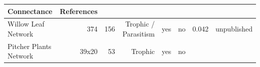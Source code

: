 \begin{longtable}[]{@{}lrrrrrrr@{}}
\begin{minipage}[b]{0.06\columnwidth}
Connectance\strut
\end{minipage} & \begin{minipage}[b]{0.22\columnwidth}\raggedleft\strut
References\strut
\end{minipage}\tabularnewline
\midrule
\endhead
\begin{minipage}[t]{0.15\columnwidth}\raggedright\strut
Willow Leaf Network\strut
\end{minipage} & \begin{minipage}[t]{0.07\columnwidth}\raggedleft\strut
374\strut
\end{minipage} & \begin{minipage}[t]{0.07\columnwidth}\raggedleft\strut
156\strut
\end{minipage} & \begin{minipage}[t]{0.11\columnwidth}\raggedleft\strut
Trophic / Parasitism\strut
\end{minipage} & \begin{minipage}[t]{0.05\columnwidth}\raggedleft\strut
yes\strut
\end{minipage} & \begin{minipage}[t]{0.04\columnwidth}\raggedleft\strut
no\strut
\end{minipage} & \begin{minipage}[t]{0.06\columnwidth}\raggedleft\strut
0.042\strut
\end{minipage} & \begin{minipage}[t]{0.22\columnwidth}\raggedleft\strut
unpublished\strut
\end{minipage}\tabularnewline
\begin{minipage}[t]{0.15\columnwidth}\raggedright\strut
Pitcher Plants Network\strut
\end{minipage} & \begin{minipage}[t]{0.07\columnwidth}\raggedleft\strut
39x20\strut
\end{minipage} & \begin{minipage}[t]{0.07\columnwidth}\raggedleft\strut
53\strut
\end{minipage} & \begin{minipage}[t]{0.11\columnwidth}\raggedleft\strut
Trophic\strut
\end{minipage} & \begin{minipage}[t]{0.05\columnwidth}\raggedleft\strut
yes\strut
\end{minipage} & \begin{minipage}[t]{0.04\columnwidth}\raggedleft\strut
no\strut
\end{minipage} & \begin{minipage}[t]{0.06\columnwidth}\raggedleft\strut

\end{minipage}
\end{longtable}
